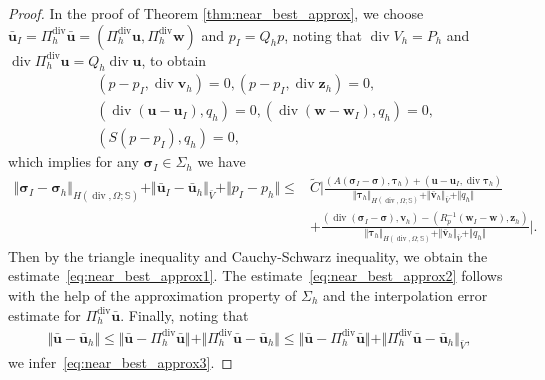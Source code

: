 \documentclass[11pt]{amsart}
\theoremstyle{remark}
\theoremstyle{definition}
\def\sig{{\bm \sigma}}
\def\btau{{\bm \tau}}
\def\bu{{\boldsymbol u}}
\def\bv{{\boldsymbol v}}
\def\bw{{\boldsymbol w}}
\renewcommand{\div}{\operatorname{div}}
\renewcommand{\div}{\operatorname{div}}
\def\sig{\boldsymbol \sigma}
\def\bu{\boldsymbol u}
\def\bv{\boldsymbol v}
\def\bw{\boldsymbol w}
\def\bz{\boldsymbol z}
\begin{document}
\begin{proof}
In the proof of Theorem \ref{thm:near_best_approx}, we choose $\bar{\bu}_I=\Pi^{\div}_h \bar{\bu}=(\Pi^{\div}_h \bu, \Pi^{\div}_h \bw)$ and $p_I=Q_h p$, noting that $\div V_h=P_h$ and $\div \Pi_h^{\div} \bu=Q_h\div \bu$, to obtain
% 
\begin{align*}
&(p-p_I, \div \bv_h)=0, (p-p_I, \div \bz_h)=0, \\
&(\div(\bu-\bu_I), q_h)=0, (\div(\bw-\bw_I), q_h)=0, \\
&(S(p-p_I), q_h)=0,
\end{align*} 
%
which implies for any $ \sig_I\in \Sigma_h$ we have
\begin{align*}
\Vert \sig_I - \sig_h \Vert_{H(\div,\Omega;\mathbb{S})} + \Vert \bar{\bu}_I - \bar{\bu}_h \Vert_{\bar{V}} +  \Vert p_I - p_h \Vert 
\le &
\tilde{C} \Big\lvert
\frac{(A (\sig_I-\sig), \bm \tau_h) + (\bu-\bu_I,\div \bm \tau_h)}
{\Vert \btau_h \Vert_{H(\div,\Omega;\mathbb{S})}+ \Vert \bar{\bv}_h \Vert_{\bar{V}} + \Vert q_h \Vert} \\
&+  \frac{(\div (\sig_I-\sig),\bv_h) -(R_p^{-1}  (\bw_I-\bw), \bz_h) }
{\Vert \btau_h \Vert_{H(\div,\Omega;\mathbb{S})}+ \Vert \bar{\bv}_h \Vert_{\bar{V}} + \Vert q_h \Vert}\Big\lvert.
\end{align*}
{
Then by the triangle inequality and Cauchy-Schwarz inequality, we obtain the estimate~\eqref{eq:near_best_approx1}.
The estimate~\eqref{eq:near_best_approx2} follows with the help of the approximation property of $\Sigma_h$ and the interpolation error estimate for $\Pi_h^{\div} \bar{\bu}$.} 
Finally, noting that 
\begin{align}
\Vert \bar{\bu} - \bar{\bu}_h \Vert\le \Vert \bar{\bu} - \Pi^{\div}_h\bar{\bu} \Vert+\Vert \Pi^{\div}_h\bar{\bu} - \bar{\bu}_h \Vert\le  \Vert \bar{\bu} - \Pi^{\div}_h\bar{\bu} \Vert+\Vert \Pi^{\div}_h\bar{\bu} - \bar{\bu}_h \Vert_{\bar{V}},
\end{align} 
we infer~\eqref{eq:near_best_approx3}.
\end{proof}
\end{document}
